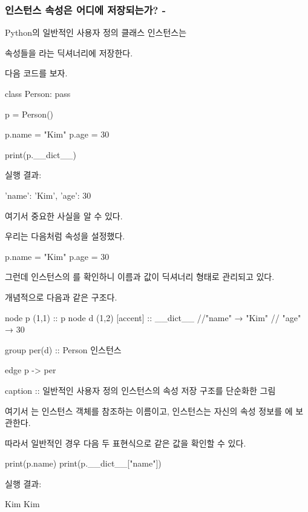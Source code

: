 \subsubsection{인스턴스 속성은 어디에 저장되는가? - }

Python의 일반적인 사용자 정의 클래스 인스턴스는

속성들을 라는 딕셔너리에 저장한다.

다음 코드를 보자.

\begin{dhkcode}
class Person:
    pass

p = Person()

p.name = "Kim"
p.age = 30

print(p.__dict__)
\end{dhkcode}

실행 결과:

\begin{dhkzsh}
{'name': 'Kim', 'age': 30}
\end{dhkzsh}

여기서 중요한 사실을 알 수 있다.

우리는 다음처럼 속성을 설정했다.

\begin{dhkcode}
p.name = "Kim"
p.age = 30
\end{dhkcode}

그런데 인스턴스의 를 확인하니 이름과 값이 딕셔너리 형태로 관리되고 있다.

개념적으로 다음과 같은 구조다.

\begin{dhkgraph}
node p (1,1) :: p
node d (1,2) [accent] :: __dict__ //"name" → "Kim" // "age" → 30

group per(d) :: Person 인스턴스

edge p -> per

caption :: 일반적인 사용자 정의 인스턴스의 속성 저장 구조를 단순화한 그림
\end{dhkgraph}

여기서 는 인스턴스 객체를 참조하는 이름이고, 인스턴스는 자신의 속성 정보를 에 보관한다.

따라서 일반적인 경우 다음 두 표현식으로 같은 값을 확인할 수 있다.

\begin{dhkcode}
print(p.name)
print(p.__dict__["name"])
\end{dhkcode}

실행 결과:

\begin{dhkzsh}
Kim
Kim
\end{dhkzsh}

